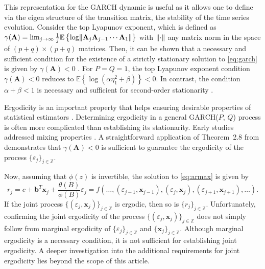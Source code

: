 \documentclass{rQUF2e}
\newcommand{\Z}{\mathbb{Z}}
\newcommand{\E}{\mathbb{E}}
\theoremstyle{plain}
\theoremstyle{definition}
\theoremstyle{remark}
\DeclarePairedDelimiter{\norma}{\lVert}{\rVert} %
\begin{document}
 This representation for the GARCH dynamic is useful as it allows one to define via the eigen structure of the transition matrix, the stability of the time series evolution. Consider the top Lyapunov exponent, which is defined as $\gamma(\mathbf{A}) = \lim_{j \rightarrow \infty} \frac{1}{j} \E \left \{  \log\norma{\mathbf{A}_j \mathbf{A}_{j - 1} \cdots \mathbf{A}_1} \right \}$ with $\norma{\cdot}$ any matrix norm in the space of $(p + q) \times (p + q)$ matrices. Then, it can be shown that a necessary and sufficient condition for the existence of a strictly stationary solution to \eqref{eq:garch} is given by $\gamma(\mathbf{A}) < 0$ \citep[thm.~2.4.]{francq2019garch}. For $P = Q = 1$, the top Lyapunov exponent condition $\gamma(\mathbf{A}) < 0$ reduces to $\E \left\{ \log \left( \alpha \eta_1^2 + \beta \right) \right\} < 0$. In contrast, the condition $\alpha + \beta < 1$ is necessary and sufficient for second-order stationarity \citep[thm.~2.5.]{francq2019garch}.

Ergodicity is an important property that helps ensuring desirable properties of statistical estimators \citep[see~p.~367]{francq2019garch}. Determining ergodicity in a general GARCH(\(P\), \(Q\)) process is often more complicated than establishing its stationarity. Early studies addressed mixing properties \citep{boussama1998ergodicite, carrasco2002mixing}. A straightforward application of Theorem~2.8 from \citet{straumann_quasi-maximum-likelihood_2006} demonstrates that \(\gamma(\mathbf{A}) < 0\) is sufficient to guarantee the ergodicity of the process \(\{\varepsilon_j\}_{j \in \mathbb{Z}}\).

Now, assuming that $\phi(z)$ is invertible, the solution to \eqref{eq:armax} is given by
$$
    r_j = c +  \mathbf{b}^T \mathbf{x}_j + \frac{\theta(B)}{\phi(B)} \varepsilon_j = f(\dots, (\varepsilon_{j - 1}, \mathbf{x}_{j - 1}), (\varepsilon_{j}, \mathbf{x}_{j}), (\varepsilon_{j + 1}, \mathbf{x}_{j + 1}), \dots).
$$
If the joint process $\{ (\varepsilon_j, \mathbf{x}_j) \}_{j \in \Z}$ is ergodic, then so is $\{ r_j \}_{j \in \Z}$. Unfortunately, confirming the joint ergodicity of the process \(\{(\varepsilon_j, \mathbf{x}_j)\}_{j \in \mathbb{Z}}\) does not simply follow from marginal ergodicity of \(\{\varepsilon_j\}_{j \in \mathbb{Z}}\) and \(\{\mathbf{x}_j\}_{j \in \mathbb{Z}}\). Although marginal ergodicity is a necessary condition, it is not sufficient for establishing joint ergodicity. A deeper investigation into the additional requirements for joint ergodicity lies beyond the scope of this article.
\end{document}
